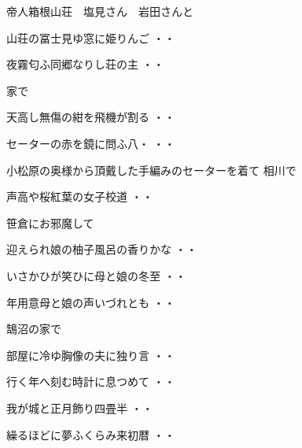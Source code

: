 \vspace{0.4cm}
帝人箱根山荘　塩見さん　岩田さんと
\begin{shiika}山荘の冨士見ゆ窓に姫りんご
\hfill{・・}\end{shiika}
\begin{shiika}夜霧匂ふ同郷なりし荘の主
\hfill{・・}\end{shiika}
\vspace{0.4cm}
家で
\begin{shiika}天高し無傷の紺を飛機が割る
\hfill{・・}\end{shiika}
\vspace{0.4cm}
\begin{shiika}セーターの赤を鏡に問ふ八・
\hfill{・・}\end{shiika}
\qquad\qquad\qquad 小松原の奥様から頂戴した手編みのセーターを着て
\vspace{0.4cm}
相川で
\begin{shiika}声高や桜紅葉の女子校道
\hfill{・・}\end{shiika}
\vspace{0.4cm}
笹倉にお邪魔して
\begin{shiika}迎えられ娘の柚子風呂の香りかな
\hfill{・・}\end{shiika}
\begin{shiika}いさかひが笑ひに母と娘の冬至
\hfill{・・}\end{shiika}
\begin{shiika}年用意母と娘の声いづれとも
\hfill{・・}\end{shiika}
\vspace{0.4cm}
鵠沼の家で
\begin{shiika}部屋に冷ゆ胸像の夫に独り言
\hfill{・・}\end{shiika}
\begin{shiika}行く年へ刻む時計に息つめて
\hfill{・・}\end{shiika}
\begin{shiika}我が城と正月飾り四畳半
\hfill{・・}\end{shiika}
\begin{shiika}繰るほどに夢ふくらみ来初暦
\hfill{・・}\end{shiika}
